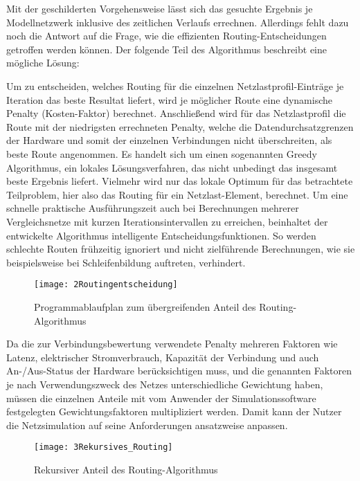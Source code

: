 Mit der geschilderten Vorgehensweise lässt sich das gesuchte Ergebnis je Modellnetzwerk inklusive des zeitlichen Verlaufs errechnen. Allerdings fehlt dazu noch die Antwort auf die Frage, wie die effizienten Routing-Entscheidungen getroffen werden können. Der folgende Teil des Algorithmus beschreibt eine mögliche Lösung:


Um zu entscheiden, welches Routing für die einzelnen Netzlastprofil-Einträge je Iteration das beste Resultat liefert, wird je möglicher Route eine dynamische Penalty (Kosten-Faktor) berechnet. Anschließend wird für das Netzlastprofil die Route mit der niedrigsten errechneten Penalty, welche die Datendurchsatzgrenzen der Hardware und somit der einzelnen Verbindungen nicht überschreiten, als beste Route angenommen. Es handelt sich um einen sogenannten Greedy Algorithmus, ein lokales Lösungsverfahren, das nicht unbedingt das insgesamt beste Ergebnis liefert. Vielmehr wird nur das lokale Optimum für das betrachtete Teilproblem, hier also das Routing für ein Netzlast-Element, berechnet. Um eine schnelle praktische Ausführungszeit auch bei Berechnungen mehrerer Vergleichsnetze mit kurzen Iterationsintervallen zu erreichen, beinhaltet der entwickelte Algorithmus intelligente Entscheidungsfunktionen.  So werden schlechte Routen frühzeitig ignoriert und nicht zielführende Berechnungen, wie sie beispielsweise bei Schleifenbildung auftreten, verhindert.
\begin{figure}[ht]
	\centering
	\texttt{[image: 2Routingentscheidung]}
	\caption{Programmablaufplan zum übergreifenden Anteil des Routing-Algorithmus}
	\label{fig:2Routingentscheidung}
\end{figure}

Da die zur Verbindungsbewertung verwendete Penalty mehreren Faktoren wie Latenz, elektrischer Stromverbrauch, Kapazität der Verbindung und auch An-/Aus-Status der Hardware berücksichtigen muss, und die genannten Faktoren je nach Verwendungszweck des Netzes unterschiedliche Gewichtung haben, müssen die einzelnen Anteile mit vom Anwender der Simulationssoftware festgelegten Gewichtungsfaktoren multipliziert werden. Damit kann der Nutzer die Netzsimulation auf seine Anforderungen ansatzweise anpassen.
\begin{figure}[ht]
	\centering
	\texttt{[image: 3Rekursives\_Routing]}
	\caption{Rekursiver Anteil des Routing-Algorithmus}
	\label{fig:3Rekursives_Routing}
\end{figure}


